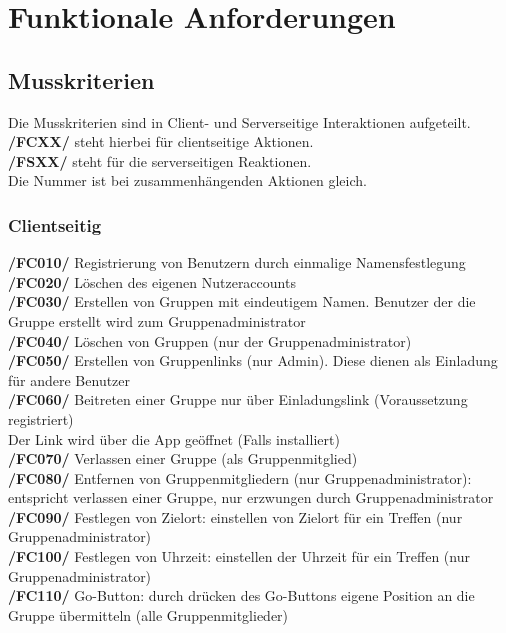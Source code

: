 \newpage
\section{Funktionale Anforderungen}
\subsection{Musskriterien}
Die Musskriterien sind in Client- und Serverseitige Interaktionen aufgeteilt.\\
\textbf{/FCXX/} steht hierbei für clientseitige Aktionen.\\
\textbf{/FSXX/} steht für die serverseitigen Reaktionen.\\
Die Nummer ist bei zusammenhängenden Aktionen gleich.\\
\subsubsection{Clientseitig}
     \textbf{/FC010/} Registrierung von Benutzern durch einmalige Namensfestlegung\\
     \textbf{/FC020/} Löschen des eigenen Nutzeraccounts\\
     \textbf{/FC030/} Erstellen von Gruppen mit eindeutigem Namen. Benutzer der die Gruppe erstellt wird zum Gruppenadministrator\\
     \textbf{/FC040/} Löschen von Gruppen (nur der Gruppenadministrator)   \\
     \textbf{/FC050/} Erstellen von Gruppenlinks (nur Admin). Diese dienen als Einladung für andere Benutzer \\
     \textbf{/FC060/} Beitreten einer Gruppe nur über Einladungslink (Voraussetzung registriert) \\
     Der Link wird über die App geöffnet (Falls installiert) \\
     \textbf{/FC070/} Verlassen einer Gruppe (als Gruppenmitglied)\\
     \textbf{/FC080/} Entfernen von Gruppenmitgliedern (nur Gruppenadministrator): entspricht verlassen einer Gruppe, nur erzwungen durch Gruppenadministrator\\
     \textbf{/FC090/} Festlegen von Zielort: einstellen von Zielort für ein Treffen (nur Gruppenadministrator)\\
     \textbf{/FC100/} Festlegen von Uhrzeit: einstellen der Uhrzeit für ein Treffen (nur Gruppenadministrator) \\
     \textbf{/FC110/} Go-Button: durch drücken des Go-Buttons eigene Position an die Gruppe übermitteln (alle Gruppenmitglieder)\\
